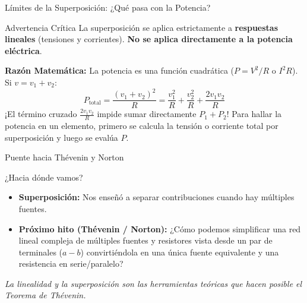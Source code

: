 \documentclass[aspectratio=169, table, xcdraw]{beamer}
\begin{document}
\begin{frame}{Límites de la Superposición: ¿Qué pasa con la Potencia?}
    \begin{alertblock}{Advertencia Crítica}
        La superposición se aplica estrictamente a \textbf{respuestas lineales} (tensiones y corrientes). \textbf{No se aplica directamente a la potencia eléctrica}.
    \end{alertblock}
    
    \vspace{0.2cm}
    \textbf{Razón Matemática:} La potencia es una función cuadrática ($P = V^2 / R$ o $I^2 R$). Si $v = v_1 + v_2$:
    \begin{equation*}
        P_{\text{total}} = \frac{(v_1 + v_2)^2}{R} = \frac{v_1^2}{R} + \frac{v_2^2}{R} + \frac{2v_1v_2}{R}
    \end{equation*}
    ¡El término cruzado $\frac{2v_1v_2}{R}$ impide sumar directamente $P_1 + P_2$! Para hallar la potencia en un elemento, primero se calcula la tensión o corriente total por superposición y luego se evalúa $P$.
\end{frame}

\begin{frame}{Puente hacia Thévenin y Norton}
    \begin{block}{¿Hacia dónde vamos?}
        \begin{itemize}
            \item \textbf{Superposición:} Nos enseñó a separar contribuciones cuando hay múltiples fuentes.
            \item \textbf{Próximo hito (Thévenin / Norton):} ¿Cómo podemos simplificar una red lineal compleja de múltiples fuentes y resistores vista desde un par de terminales ($a-b$) convirtiéndola en una única fuente equivalente y una resistencia en serie/paralelo?
        \end{itemize}
    \end{block}
    \centering
    \textit{La linealidad y la superposición son las herramientas teóricas que hacen posible el Teorema de Thévenin.}
\end{frame}
\end{document}
